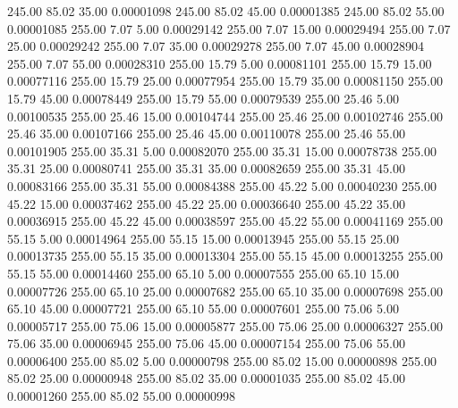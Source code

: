     245.00     85.02     35.00     0.00001098
    245.00     85.02     45.00     0.00001385
    245.00     85.02     55.00     0.00001085
    255.00      7.07      5.00     0.00029142
    255.00      7.07     15.00     0.00029494
    255.00      7.07     25.00     0.00029242
    255.00      7.07     35.00     0.00029278
    255.00      7.07     45.00     0.00028904
    255.00      7.07     55.00     0.00028310
    255.00     15.79      5.00     0.00081101
    255.00     15.79     15.00     0.00077116
    255.00     15.79     25.00     0.00077954
    255.00     15.79     35.00     0.00081150
    255.00     15.79     45.00     0.00078449
    255.00     15.79     55.00     0.00079539
    255.00     25.46      5.00     0.00100535
    255.00     25.46     15.00     0.00104744
    255.00     25.46     25.00     0.00102746
    255.00     25.46     35.00     0.00107166
    255.00     25.46     45.00     0.00110078
    255.00     25.46     55.00     0.00101905
    255.00     35.31      5.00     0.00082070
    255.00     35.31     15.00     0.00078738
    255.00     35.31     25.00     0.00080741
    255.00     35.31     35.00     0.00082659
    255.00     35.31     45.00     0.00083166
    255.00     35.31     55.00     0.00084388
    255.00     45.22      5.00     0.00040230
    255.00     45.22     15.00     0.00037462
    255.00     45.22     25.00     0.00036640
    255.00     45.22     35.00     0.00036915
    255.00     45.22     45.00     0.00038597
    255.00     45.22     55.00     0.00041169
    255.00     55.15      5.00     0.00014964
    255.00     55.15     15.00     0.00013945
    255.00     55.15     25.00     0.00013735
    255.00     55.15     35.00     0.00013304
    255.00     55.15     45.00     0.00013255
    255.00     55.15     55.00     0.00014460
    255.00     65.10      5.00     0.00007555
    255.00     65.10     15.00     0.00007726
    255.00     65.10     25.00     0.00007682
    255.00     65.10     35.00     0.00007698
    255.00     65.10     45.00     0.00007721
    255.00     65.10     55.00     0.00007601
    255.00     75.06      5.00     0.00005717
    255.00     75.06     15.00     0.00005877
    255.00     75.06     25.00     0.00006327
    255.00     75.06     35.00     0.00006945
    255.00     75.06     45.00     0.00007154
    255.00     75.06     55.00     0.00006400
    255.00     85.02      5.00     0.00000798
    255.00     85.02     15.00     0.00000898
    255.00     85.02     25.00     0.00000948
    255.00     85.02     35.00     0.00001035
    255.00     85.02     45.00     0.00001260
    255.00     85.02     55.00     0.00000998

